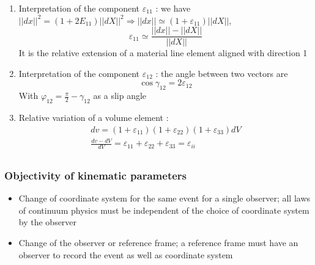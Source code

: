 \documentclass[../main.tex]{subfiles}
\begin{document}
\begin{enumerate}
    \item Interpretation of the component $\varepsilon_{11}$ : we have $\lvert \lvert dx\rvert \rvert^2 = (1+2E_{11}) \lvert \lvert dX\rvert \rvert^2 \Rightarrow \lvert \lvert dx\rvert \rvert \simeq (1+\varepsilon_{11})\lvert\lvert dX\rvert \rvert$, \begin{equation}
        \varepsilon_{11} \simeq \frac{\lvert \lvert dx\rvert \rvert - \lvert \lvert dX\rvert \rvert}{\lvert \lvert dX\rvert \rvert}
    \end{equation}
    It is the relative extension of a material line element aligned with direction 1\\
    \item Interpretation of the component $\varepsilon_{12}$ : the angle between two vectors are \begin{equation}
        \cos \gamma_{12} = 2\varepsilon_{12}
    \end{equation}
    With $\varphi_{12} = \frac{\pi}{2}-\gamma_{12}$ as a slip angle\\
    \item Relative variation of a volume element : \begin{equation}
        \begin{gathered}
            dv = (1+\varepsilon_{11})(1+\varepsilon_{22})(1+\varepsilon_{33})dV\\
            \frac{dv-dV}{dV} = \varepsilon_{11} + \varepsilon_{22} + \varepsilon_{33} = \varepsilon_{ii}\\
        \end{gathered}
    \end{equation}
\end{enumerate}

\subsubsection{Objectivity of kinematic parameters}
\begin{itemize}
    \item Change of coordinate system for the same event for a single observer; all laws of continuum physics must be independent of the choice of coordinate system by the observer\\
    \item Change of the observer or reference frame; a reference frame must have an observer to record the event as well as coordinate system\\
\end{itemize}
\end{document}
